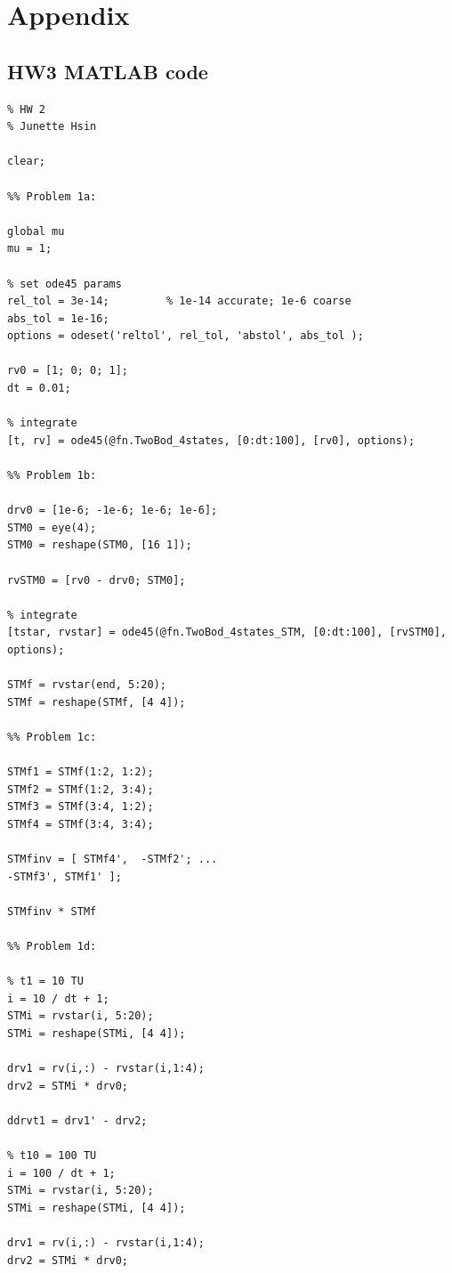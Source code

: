 \documentclass[conf]{new-aiaa}
\begin{document}
\section*{Appendix} 



\subsection*{HW3 MATLAB code} 

\begin{lstlisting}[basicstyle=\footnotesize]
% ASE 389 Orbit Determination
% HW 2
% Junette Hsin 

clear; 

%% Problem 1a: 

global mu 
mu = 1; 

% set ode45 params 
rel_tol = 3e-14;         % 1e-14 accurate; 1e-6 coarse 
abs_tol = 1e-16; 
options = odeset('reltol', rel_tol, 'abstol', abs_tol ); 

rv0 = [1; 0; 0; 1]; 
dt = 0.01; 

% integrate 
[t, rv] = ode45(@fn.TwoBod_4states, [0:dt:100], [rv0], options); 

%% Problem 1b: 

drv0 = [1e-6; -1e-6; 1e-6; 1e-6]; 
STM0 = eye(4); 
STM0 = reshape(STM0, [16 1]); 

rvSTM0 = [rv0 - drv0; STM0]; 

% integrate 
[tstar, rvstar] = ode45(@fn.TwoBod_4states_STM, [0:dt:100], [rvSTM0], options); 

STMf = rvstar(end, 5:20); 
STMf = reshape(STMf, [4 4]); 

%% Problem 1c: 

STMf1 = STMf(1:2, 1:2); 
STMf2 = STMf(1:2, 3:4); 
STMf3 = STMf(3:4, 1:2); 
STMf4 = STMf(3:4, 3:4); 

STMfinv = [ STMf4',  -STMf2'; ... 
-STMf3', STMf1' ]; 

STMfinv * STMf 

%% Problem 1d: 

% t1 = 10 TU
i = 10 / dt + 1; 
STMi = rvstar(i, 5:20); 
STMi = reshape(STMi, [4 4]); 

drv1 = rv(i,:) - rvstar(i,1:4); 
drv2 = STMi * drv0; 

ddrvt1 = drv1' - drv2; 

% t10 = 100 TU
i = 100 / dt + 1; 
STMi = rvstar(i, 5:20); 
STMi = reshape(STMi, [4 4]); 

drv1 = rv(i,:) - rvstar(i,1:4); 
drv2 = STMi * drv0; 


\end{lstlisting}
\end{document}
